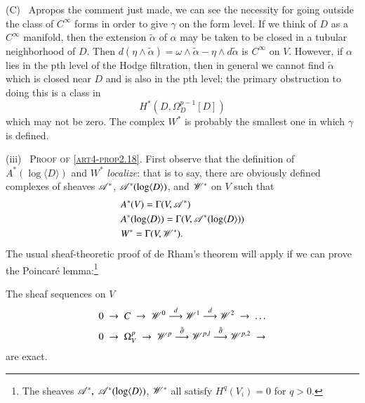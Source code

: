 \medskip
\noindent
(C)~ Apropos the comment just made, we can see the necessity for going outside the class of $C^\infty$ forms in order to give $\gamma$ on the form level. If we think of $D$ as a $C^\infty$ manifold, then the extension $\tilde{\alpha}$ of $\alpha$ may be taken to be closed in a tubular neighborhood of $D$. Then $d (\eta \wedge \tilde{\alpha}) = \omega \wedge \tilde{\alpha} - \eta \wedge d \tilde{\alpha}$ is $C^\infty$ on $V$. However, if $\alpha$ lies in the pth level of the Hodge filtration, then in general we cannot find $\tilde{\alpha}$ which is closed near $D$ and is also in the pth level; the primary obstruction to doing this is a class in 
$$
H^\ast (D, \Omega^{p-1}_D [D])
$$
which may not be zero. The complex $W^\ast$ is probably the smallest one in which $\gamma$ is defined.

\medskip
\noindent
(iii)~ \textsc{Proof of \eqref{art4-prop2.18}}. First observe that the definition of $A^\ast (\log \langle D \rangle)$ and $W^\ast$ \textit{localize}: that is to say, there are obviously defined complexes of sheaves $\mathscr{A}^\ast$, $\mathscr{A}^\ast (\log \langle D \rangle)$, and $\mathscr{W}^\ast$ on $V$ such that
\begin{align*}
& A^\ast (V) = \Gamma (V, \mathscr{A}^\ast)\\
& A^\ast (\log \langle D \rangle) = \Gamma (V, \mathscr{A}^\ast (\log \langle D \rangle))\\
& W^\ast = \Gamma (V, \mathscr{W}^\ast).
\end{align*}
The usual sheaf-theoretic proof of de Rham's theorem will apply if we can prove the Poincar\'e lemma:\footnote[6]{The sheaves $\mathscr{A}^\ast, \; \mathscr{A}^\ast(\log \langle D \rangle)$, $\mathscr{W}^\ast$ all satisfy $H^q (V_i) =0$ for $q > 0$.}
 
\setcounter{lemma}{19}
\begin{lemma}\label{art4-lem2.20}
The sheaf sequences on $V$
\begin{align*}
& 0 \;  \to  \; C \; \to \; \mathscr{W}^0 \; {\displaystyle{\mathop{\longrightarrow}^d}} \; \mathscr{W}^1 \; {\displaystyle{\mathop{\longrightarrow}^d}} \; \mathscr{W}^2  \; \to  \; \ldots \\
& 0 \; \to \; \Omega^p_V \; \to \; \mathscr{W}^p \; {\displaystyle{\mathop{\longrightarrow}^{\bar{\partial}}}} \; \mathscr{W}^{p,l} \; {\displaystyle{\mathop{\longrightarrow}^{\bar{\partial}}}} \; \mathscr{W}^{p,2} \; \to 
\end{align*}
are exact.
\end{lemma}

